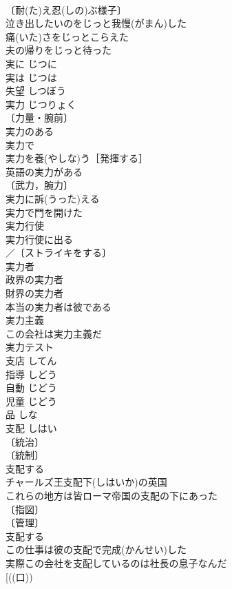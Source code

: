 \documentclass[8pt]{extreport}
\begin{document}
\begin{CJK}{UTF8}{min}
\\	〔耐(た)え忍(しの)ぶ様子〕
\\	泣き出したいのをじっと我慢(がまん)した 
\\	痛(いた)さをじっとこらえた 
\\	夫の帰りをじっと待った 
\\	実に	じつに	
\\	実は	じつは	
\\	失望	しつぼう	
\\	実力	じつりょく	
\\	〔力量・腕前〕
\\	実力のある 
\\	実力で 
\\	実力を養(やしな)う［発揮する］ 
\\	英語の実力がある 
\\	〔武力，腕力〕
\\	実力に訴(うった)える 
\\	実力で門を開けた 
\\	実力行使 
\\	実力行使に出る 
\\	／〔ストライキをする〕
\\	実力者 
\\	政界の実力者 
\\	財界の実力者 
\\	本当の実力者は彼である 
\\	実力主義 
\\	この会社は実力主義だ 
\\	実力テスト 
\\	支店	してん	
\\	指導	しどう	
\\	自動	じどう	
\\	児童	じどう	
\\	品	しな	
\\	支配	しはい	
\\	〔統治〕
\\	〔統制〕
\\	支配する 
\\	チャールズ王支配下(しはいか)の英国 
\\	これらの地方は皆ローマ帝国の支配の下にあった 
\\	〔指図〕
\\	〔管理〕
\\	支配する 
\\	この仕事は彼の支配で完成(かんせい)した 
\\	実際この会社を支配しているのは社長の息子なんだ 
\\	[((口))

\end{CJK}
\end{document}
